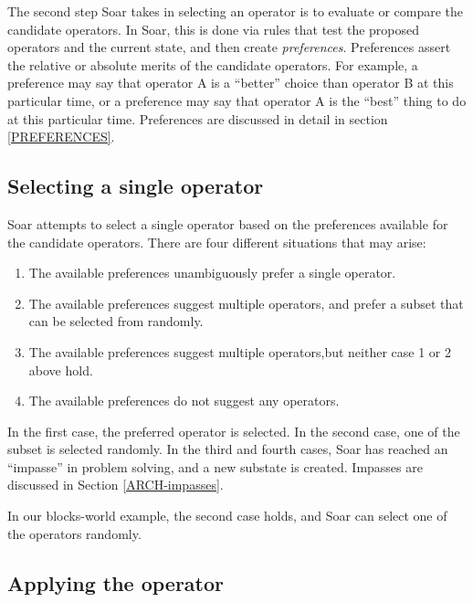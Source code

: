 The second step Soar takes in selecting an operator is to evaluate or
compare the candidate operators. In Soar, this is done via rules that
test the proposed operators and the current state, and then create
\emph{preferences}.  Preferences assert the relative or absolute merits of the
candidate operators. For example, a preference may say that operator A
is a ``better'' choice than operator B at this particular time, or a
preference may say that operator A is the ``best'' thing to do at this
particular time. Preferences are discussed in detail in section \ref{PREFERENCES}. 

\subsection{Selecting a single operator}

Soar attempts to select a single operator based on the preferences available
for the candidate operators. There are four different situations that may
arise:\vspace{-14pt}
\begin{enumerate}
\item The available preferences unambiguously prefer a single operator.\vspace{-
6pt}
\item The available preferences suggest multiple operators, and 
       prefer a subset that can be selected from randomly.\vspace{-6pt}
\item The available preferences suggest multiple operators,but neither case
       1 or 2 above hold.\vspace{-6pt}
\item The available preferences do not suggest any operators.
\end{enumerate}

In the first case, the preferred operator is selected.  In the second
case, one of the subset is selected randomly. In the third and fourth
cases, Soar has reached an ``impasse'' in problem solving, and a new
substate is created.  Impasses are discussed in Section
\ref{ARCH-impasses}.

In our blocks-world example, the second case holds, and Soar can select one of
the operators randomly.

\subsection{Applying the operator}

